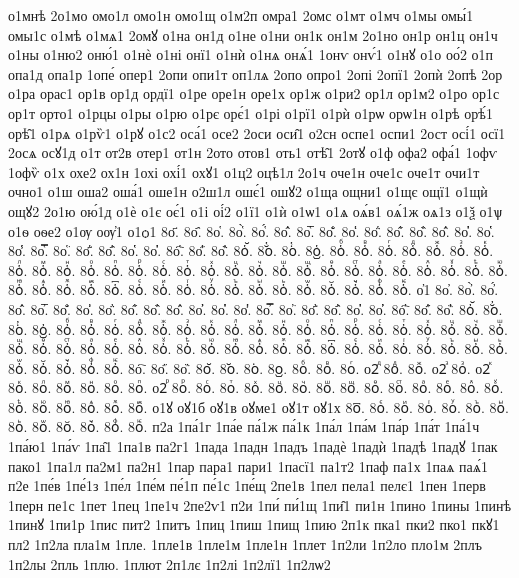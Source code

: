{о1мнѣ
2о1мо
омо1л
омо1н
омо1щ
о1м2п
омра1
2омс
о1мт
о1мч
о1мы
омы́1
омы1с
о1мѣ
о1мѧ1
2омꙋ
о1на
он1д
о1не
о1ни
он1к
он1м
2о1но
он1р
он1ц
он1ч
о1ны
о1ню2
оню́1
о1нѐ
о1ні
онї1
о1нѝ
о1нѧ
онѧ́1
1онѵ
онѵ́1
о1нꙋ
о1о
оо́2
о1п
опа1д
опа1р
1опе́
опер1
2опи
опи1т
оп1лѧ
2опо
опро1
2опі
2опї1
2опѝ
2опѣ
2ор
о1ра
орас1
ор1в
ор1д
ордї1
о1ре
оре1н
оре1х
ор1ж
о1ри2
ор1л
ор1м2
о1ро
ор1с
ор1т
орто1
о1рцы
о1ры
о1рю
о1рє
орє́1
о1рі
о1рї1
о1рѝ
о1рѡ
орѡ1н
о1рѣ
орѣ́1
орѣ̑1
о1рѧ
о1рѷ1
о1рꙋ
о1с2
оса́1
осе2
2оси
оси̑1
о2сн
оспе1
оспи1
2ост
осі́1
осї1
2осѧ
осꙋ1д
о1т
от2в
отер1
от1н
2ото
отов1
оть1
отѣ̑1
2отꙋ
о1ф
офа2
офа́1
1офѵ
1офѷ
о1х
охе2
ох1н
1охі
охі́1
охꙋ1
о1ц2
оцѣ1л
2о1ч
оче1н
оче1с
оче1т
очи1т
очно1
о1ш
оша2
оша́1
оше1н
о2ш1л
ошє́1
ошꙋ2
о1ща
ощни1
о1щє
ощї1
о1щѝ
ощꙋ2
2о1ю
ою́1д
о1ѐ
о1є
оє́1
о1і
оі́2
о1ї1
о1ѝ
о1ѡ1
о1ѧ
оѧ́в1
оѧ́1ж
оѧ1з
о1ѯ
о1ѱ
о1ѳ
оѳе2
о1ѹ
оѹ҆1
о1ѻ1
8о҃.
8о҄.
8о҅.
8о҅̀.
8о҅́.
8о҅̂.
8о҅̅.
8о҅̆.
8о҅̇.
8о҅̈.
8о҅̋.
8о҅̏.
8о҅̑.
8о҅̓.
8о҅̔.
8о҅̾.
8о҅̿.
8о҅͘.
8о҅҃.
8о҅҄.
8о҅҅.
8о҅҆.
8о҅҇.
8о҅᷀.
8о҅᷁.
8о҅᷶.
8о᷷҅.
8о᷸҅.
8о᷹҅.
8о҅ⷠ.
8о҅ⷡ.
8о҅ⷢ.
8о҅ⷣ.
8о҅ⷤ.
8о҅ⷥ.
8о҅ⷦ.
8о҅ⷧ.
8о҅ⷨ.
8о҅ⷩ.
8о҅ⷪ.
8о҅ⷫ.
8о҅ⷬ.
8о҅ⷭ.
8о҅ⷮ.
8о҅ⷯ.
8о҅ⷰ.
8о҅ⷱ.
8о҅ⷲ.
8о҅ⷳ.
8о҅ⷴ.
8о҅ⷵ.
8о҅ⷶ.
8о҅ⷷ.
8о҅ⷸ.
8о҅ⷹ.
8о҅ⷺ.
8о҅ⷻ.
8о҅ⷼ.
8о҅ⷽ.
8о҅ⷾ.
8о҅ⷿ.
8о҅꙯.
8о҅ꙴ.
8о҅ꙵ.
8о҅ꙶ.
8о҅ꙷ.
8о҅ꙸ.
8о҅ꙹ.
8о҅ꙺ.
8о҅ꙻ.
8о҅꙼.
8о҅꙽.
8о҅ꚞ.
8о҅ꚟ.
о҆1
8о҆.
8о҆̀.
8о҆́.
8о҆̂.
8о҆̅.
8о҆̆.
8о҆̇.
8о҆̈.
8о҆̋.
8о҆̏.
8о҆̑.
8о҆̓.
8о҆̔.
8о҆̾.
8о҆̿.
8о҆͘.
8о҆҃.
8о҆҄.
8о҆҅.
8о҆҆.
8о҆҇.
8о҆᷀.
8о҆᷁.
8о҆᷶.
8о᷷҆.
8о᷸҆.
8о᷹҆.
8о҆ⷠ.
8о҆ⷡ.
8о҆ⷢ.
8о҆ⷣ.
8о҆ⷤ.
8о҆ⷥ.
8о҆ⷦ.
8о҆ⷧ.
8о҆ⷨ.
8о҆ⷩ.
8о҆ⷪ.
8о҆ⷫ.
8о҆ⷬ.
8о҆ⷭ.
8о҆ⷮ.
8о҆ⷯ.
8о҆ⷰ.
8о҆ⷱ.
8о҆ⷲ.
8о҆ⷳ.
8о҆ⷴ.
8о҆ⷵ.
8о҆ⷶ.
8о҆ⷷ.
8о҆ⷸ.
8о҆ⷹ.
8о҆ⷺ.
8о҆ⷻ.
8о҆ⷼ.
8о҆ⷽ.
8о҆ⷾ.
8о҆ⷿ.
8о҆꙯.
8о҆ꙴ.
8о҆ꙵ.
8о҆ꙶ.
8о҆ꙷ.
8о҆ꙸ.
8о҆ꙹ.
8о҆ꙺ.
8о҆ꙻ.
8о҆꙼.
8о҆꙽.
8о҆ꚞ.
8о҆ꚟ.
8о҇.
8о᷀.
8о᷁.
8о᷶.
8о᷷.
8о᷸.
8о᷹.
8оⷠ.
8оⷡ.
8оⷢ.
о2ⷣ
8оⷣ.
8оⷤ.
о2ⷥ
8оⷥ.
о2ⷦ
8оⷦ.
8оⷧ.
8оⷨ.
8оⷩ.
8оⷪ.
8оⷫ.
о2ⷬ
8оⷬ.
8оⷭ.
8оⷮ.
8оⷯ.
8оⷰ.
8оⷱ.
8оⷲ.
8оⷳ.
8оⷴ.
8оⷵ.
8оⷶ.
8оⷷ.
8оⷸ.
8оⷹ.
8оⷺ.
8оⷻ.
8оⷼ.
8оⷽ.
8оⷾ.
8оⷿ.
о1ꙋ
оꙋ1б
оꙋ1в
оꙋме1
оꙋ1т
оꙋ1х
8о꙯.
8оꙴ.
8оꙵ.
8оꙶ.
8оꙷ.
8оꙸ.
8оꙹ.
8оꙺ.
8оꙻ.
8о꙼.
8о꙽.
8оꚞ.
8оꚟ.
п2а
1па́1г
1па́е
па́1ж
па́1к
1па́л
1па́м
1па́р
1па́т
1па́1ч
1па́ю1
1па́ѵ
1па̑1
1па1в
па2г1
1пада
1падн
1падъ
1падѐ
1падѝ
1падѣ
1падꙋ
1пак
пако1
1па1л
па2м1
па2н1
1пар
пара1
пари1
1пасї1
па1т2
1паф
па1х
1паѧ
паѧ́1
п2е
1пе́в
1пе́1з
1пе́л
1пе́м
пе́1п
пе́1с
1пе́щ
2пе1в
1пел
пела1
пелє1
1пен
1перв
1перн
пе1с
1пет
1пец
1пе1ч
2пе2ѵ1
п2и
1пи́
пи́1щ
1пи̑1
пи1н
1пино
1пины
1пинѣ
1пинꙋ
1пи1р
1пис
пит2
1питъ
1пиц
1пиш
1пищ
1пию
2п1к
пка1
пки2
пко1
пкꙋ1
пл2
1п2ла
пла1м
1пле.
1пле1в
1пле1м
1пле1н
1плет
1п2ли
1п2ло
пло1м
2плъ
1п2лы
2пль
1плю.
1плют
2п1лє
1п2лі
1п2лї1
1п2лѡ2
}
